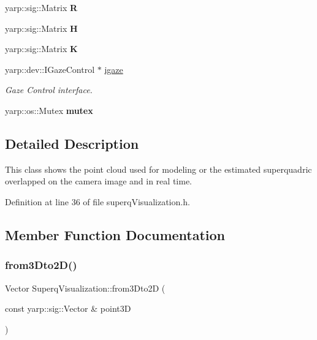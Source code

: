 \begin{DoxyCompactItemize}
\mbox{\label{classSuperqVisualization_ad38ada4dfaaf6ced81c6da9aacba4bc0}} 
yarp\+::sig\+::\+Matrix {\bfseries R}
\item 
\mbox{\label{classSuperqVisualization_a64d02e9b2b003bb30235522f1b293a59}} 
yarp\+::sig\+::\+Matrix {\bfseries H}
\item 
\mbox{\label{classSuperqVisualization_a3b44b49611b760f95341303143b72804}} 
yarp\+::sig\+::\+Matrix {\bfseries K}
\item 
\mbox{\label{classSuperqVisualization_a70393943f451663a458119c63b6e0ebf}} 
yarp\+::dev\+::\+I\+Gaze\+Control $\ast$ \mbox{\hyperlink{classSuperqVisualization_a70393943f451663a458119c63b6e0ebf}{igaze}}
\begin{DoxyCompactList}\small\item\em Gaze Control interface. \end{DoxyCompactList}\item 
\mbox{\label{classSuperqVisualization_a5925440ac066d2d7dd40df5758e76bbf}} 
yarp\+::os\+::\+Mutex {\bfseries mutex}
\end{DoxyCompactItemize}


\subsection{Detailed Description}
This class shows the point cloud used for modeling or the estimated superquadric overlapped on the camera image and in real time. 

Definition at line 36 of file superq\+Visualization.\+h.



\subsection{Member Function Documentation}
\mbox{\label{classSuperqVisualization_aff405a4d0ad916decad09f923e319be6}} 
\subsubsection{\texorpdfstring{from3\+Dto2\+D()}{from3Dto2D()}}
{\footnotesize\ttfamily Vector Superq\+Visualization\+::from3\+Dto2D (\begin{DoxyParamCaption}\item[{const yarp\+::sig\+::\+Vector \&}]{point3D }\end{DoxyParamCaption})}



